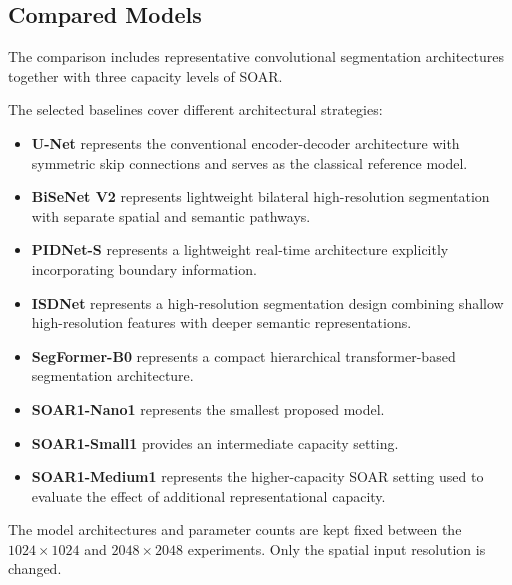 \documentclass[11pt,a4paper]{article}
\begin{document}
\subsection{Compared Models}

The comparison includes representative convolutional segmentation 
architectures together with three capacity levels of SOAR.

The selected baselines cover different architectural strategies:

\begin{itemize}

    \item \textbf{U-Net} represents the conventional encoder-decoder 
    architecture with symmetric skip connections and serves as the 
    classical reference model.

    \item \textbf{BiSeNet V2} represents lightweight bilateral 
    high-resolution segmentation with separate spatial and semantic 
    pathways.

    \item \textbf{PIDNet-S} represents a lightweight real-time architecture 
    explicitly incorporating boundary information.

    \item \textbf{ISDNet} represents a high-resolution segmentation design 
    combining shallow high-resolution features with deeper semantic 
    representations.

    \item \textbf{SegFormer-B0} represents a compact hierarchical 
    transformer-based segmentation architecture.

    \item \textbf{SOAR1-Nano1} represents the smallest proposed model.

    \item \textbf{SOAR1-Small1} provides an intermediate capacity setting.

    \item \textbf{SOAR1-Medium1} represents the higher-capacity SOAR setting 
    used to evaluate the effect of additional representational capacity.

\end{itemize}

The model architectures and parameter counts are kept fixed between the 
$1024\times1024$ and $2048\times2048$ experiments. Only the spatial input 
resolution is changed.
\end{document}
